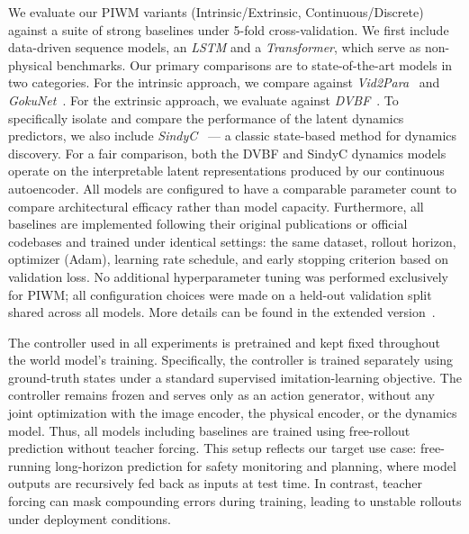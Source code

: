 \documentclass[nonacm,sigconf]{acmart}
\begin{document}
We evaluate our PIWM variants (Intrinsic/Extrinsic, Continuous/Discrete) against a suite of strong baselines under 5-fold cross-validation. We first include data-driven sequence models, an \textit{LSTM} and a \textit{Transformer}, which serve as non-physical benchmarks. Our primary comparisons are to state-of-the-art models in two categories. For the {intrinsic} approach, we compare against \textit{Vid2Para}~\cite[]{asenov2019vid2param} and \textit{GokuNet}~\cite[]{linial_generative_2021}. For the {extrinsic} approach, we evaluate against \textit{DVBF}~\cite[]{karl2016deep}. To specifically isolate and compare the performance of the latent dynamics predictors, we also include \textit{SindyC}~\cite[]{BRUNTON2016710} --- a classic state-based method for dynamics discovery. For a fair comparison, both the DVBF and SindyC dynamics models operate on the interpretable latent representations produced by our continuous autoencoder. All models are configured to have a comparable parameter count to compare architectural efficacy rather than model capacity. Furthermore, all baselines are implemented following their original publications or official codebases and trained under identical settings: the same dataset, rollout horizon, optimizer (Adam), learning rate schedule, and early stopping criterion based on validation loss. No additional hyperparameter tuning was performed exclusively for PIWM; all configuration choices were made on a held-out validation split shared across all models. More details can be found in the extended version~\cite{extended}. 

The controller used in all experiments is pretrained and kept fixed throughout the world model's training. Specifically, the controller is trained separately using ground-truth states under a standard supervised imitation-learning objective. The controller remains frozen and serves only as an action generator, without any joint optimization with the image encoder, the physical encoder, or the dynamics model. Thus, all models including baselines are trained using free-rollout prediction without teacher forcing. This setup reflects our target use case: free-running long-horizon prediction for safety monitoring and planning, where model outputs are recursively fed back as inputs at test time. In contrast, teacher forcing can mask compounding errors during training, leading to unstable rollouts under deployment conditions. 
\end{document}

